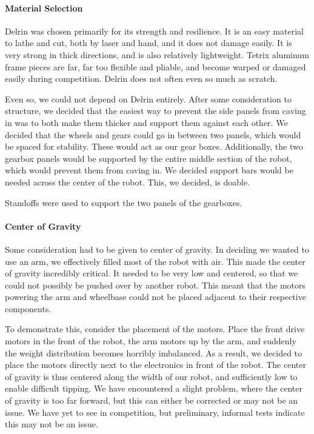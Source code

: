 \paragraph{Material Selection} Delrin was chosen primarily for its strength and resilience. It is an easy material to lathe and cut, both by laser and hand, and it does not damage easily. It is very strong in thick directions, and is also relatively lightweight. Tetrix aluminum frame pieces are far, far too flexible and pliable, and become warped or damaged easily during competition. Delrin does not often even so much as scratch.

Even so, we could not depend on Delrin entirely. After some consideration to structure, we decided that the easiest way to prevent the side panels from caving in was to both make them thicker and support them against each other. We decided that the wheels and gears could go in between two panels, which would be spaced for stability. These would act as our gear boxes. Additionally, the two gearbox panels would be supported by the entire middle section of the robot, which would prevent them from caving in. We decided support bars would be needed across the center of the robot. This, we decided, is doable.

Standoffs were used to support the two panels of the gearboxes.

\paragraph{Center of Gravity} Some consideration had to be given to center of gravity. In deciding we wanted to use an arm, we effectively filled most of the robot with air. This made the center of gravity incredibly critical. It needed to be very low and centered, so that we could not possibly be pushed over by another robot. This meant that the motors powering the arm and wheelbase could not be placed adjacent to their respective components. 

To demonstrate this, consider the placement of the motors. Place the front drive motors in the front of the robot, the arm motors up by the arm, and suddenly the weight distribution becomes horribly imbalanced. As a result, we decided to place the motors directly next to the electronics in front of the robot. The center of gravity is thus centered along the width of our robot, and sufficiently low to enable difficult tipping. We have encountered a slight problem, where the center of gravity is too far forward, but this can either be corrected or may not be an issue. We have yet to see in competition, but preliminary, informal tests indicate this may not be an issue. 

